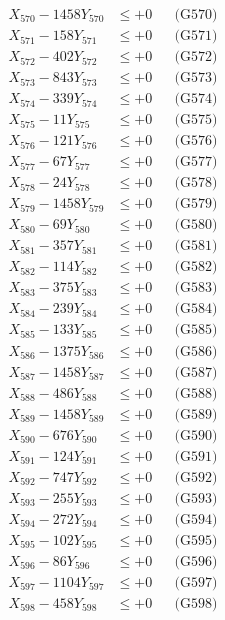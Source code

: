 \documentclass[a4paper,10pt]{article}
\begin{document}
{\begin{align}
X_{570} - 1458Y_{570} &\leq +0 && \text{(G570)} \\
\allowbreak
X_{571} - 158Y_{571} &\leq +0 && \text{(G571)} \\
X_{572} - 402Y_{572} &\leq +0 && \text{(G572)} \\
X_{573} - 843Y_{573} &\leq +0 && \text{(G573)} \\
X_{574} - 339Y_{574} &\leq +0 && \text{(G574)} \\
X_{575} - 11Y_{575} &\leq +0 && \text{(G575)} \\
X_{576} - 121Y_{576} &\leq +0 && \text{(G576)} \\
X_{577} - 67Y_{577} &\leq +0 && \text{(G577)} \\
X_{578} - 24Y_{578} &\leq +0 && \text{(G578)} \\
X_{579} - 1458Y_{579} &\leq +0 && \text{(G579)} \\
X_{580} - 69Y_{580} &\leq +0 && \text{(G580)} \\
\allowbreak
X_{581} - 357Y_{581} &\leq +0 && \text{(G581)} \\
X_{582} - 114Y_{582} &\leq +0 && \text{(G582)} \\
X_{583} - 375Y_{583} &\leq +0 && \text{(G583)} \\
X_{584} - 239Y_{584} &\leq +0 && \text{(G584)} \\
X_{585} - 133Y_{585} &\leq +0 && \text{(G585)} \\
X_{586} - 1375Y_{586} &\leq +0 && \text{(G586)} \\
X_{587} - 1458Y_{587} &\leq +0 && \text{(G587)} \\
X_{588} - 486Y_{588} &\leq +0 && \text{(G588)} \\
X_{589} - 1458Y_{589} &\leq +0 && \text{(G589)} \\
X_{590} - 676Y_{590} &\leq +0 && \text{(G590)} \\
\allowbreak
X_{591} - 124Y_{591} &\leq +0 && \text{(G591)} \\
X_{592} - 747Y_{592} &\leq +0 && \text{(G592)} \\
X_{593} - 255Y_{593} &\leq +0 && \text{(G593)} \\
X_{594} - 272Y_{594} &\leq +0 && \text{(G594)} \\
X_{595} - 102Y_{595} &\leq +0 && \text{(G595)} \\
X_{596} - 86Y_{596} &\leq +0 && \text{(G596)} \\
X_{597} - 1104Y_{597} &\leq +0 && \text{(G597)} \\
X_{598} - 458Y_{598} &\leq +0 && \text{(G598)} \\

\end{align}}
\end{document}
